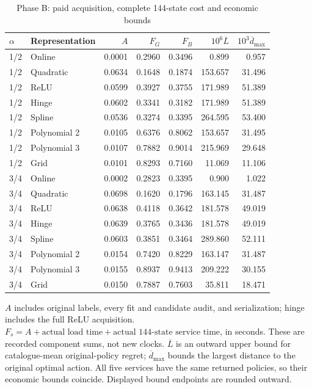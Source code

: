 \begin{table}[t]\centering\small
\caption{Phase B: paid acquisition, complete 144-state cost and economic bounds}
\label{tab:cost119b}
\begin{tabular}{llrrrrr}\toprule
$\alpha$ & Representation & $A$ & $F_G$ & $F_B$ & $10^6\overline L$ & $10^3\overline d_{\max}$\\\midrule
1/2 & Online & 0.0001 & 0.2960 & 0.3496 & 0.899 & 0.957 \\
1/2 & Quadratic & 0.0634 & 0.1648 & 0.1874 & 153.657 & 31.496 \\
1/2 & ReLU & 0.0599 & 0.3927 & 0.3755 & 171.989 & 51.389 \\
1/2 & Hinge & 0.0602 & 0.3341 & 0.3182 & 171.989 & 51.389 \\
1/2 & Spline & 0.0536 & 0.3274 & 0.3395 & 264.595 & 53.400 \\
1/2 & Polynomial 2 & 0.0105 & 0.6376 & 0.8062 & 153.657 & 31.495 \\
1/2 & Polynomial 3 & 0.0107 & 0.7882 & 0.9014 & 215.969 & 29.648 \\
1/2 & Grid & 0.0101 & 0.8293 & 0.7160 & 11.069 & 11.106 \\
3/4 & Online & 0.0002 & 0.2823 & 0.3395 & 0.900 & 1.022 \\
3/4 & Quadratic & 0.0698 & 0.1620 & 0.1796 & 163.145 & 31.487 \\
3/4 & ReLU & 0.0638 & 0.4118 & 0.3642 & 181.578 & 49.019 \\
3/4 & Hinge & 0.0639 & 0.3765 & 0.3436 & 181.578 & 49.019 \\
3/4 & Spline & 0.0603 & 0.3851 & 0.3464 & 289.860 & 52.111 \\
3/4 & Polynomial 2 & 0.0154 & 0.7420 & 0.8229 & 163.147 & 31.487 \\
3/4 & Polynomial 3 & 0.0155 & 0.8937 & 0.9413 & 209.222 & 30.155 \\
3/4 & Grid & 0.0150 & 0.7887 & 0.7603 & 35.811 & 18.471 \\
\bottomrule\end{tabular}
\par\smallskip\footnotesize
$A$ includes original labels, every fit and candidate audit, and serialization; hinge includes the full ReLU acquisition. $F_s=A+\text{actual load time}+\text{actual 144-state service time}$, in seconds. These are recorded component sums, not new clocks. $\overline L$ is an outward upper bound for catalogue-mean original-policy regret; $\overline d_{\max}$ bounds the largest distance to the original optimal action. All five services have the same returned policies, so their economic bounds coincide. Displayed bound endpoints are rounded outward.
\end{table}
